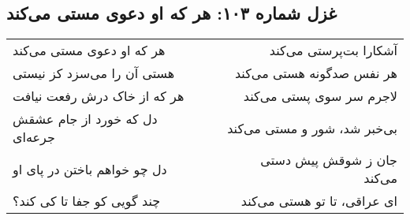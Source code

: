 \begin{center}
\section*{غزل شماره ۱۰۳: هر که او دعوی مستی می‌کند}
\label{sec:103}
\begin{longtable}{l p{0.5cm} r}
هر که او دعوی مستی می‌کند
&&
آشکارا بت‌پرستی می‌کند
\\
هستی آن را می‌سزد کز نیستی
&&
هر نفس صدگونه هستی می‌کند
\\
هر که از خاک درش رفعت نیافت
&&
لاجرم سر سوی پستی می‌کند
\\
دل که خورد از جام عشقش جرعه‌ای
&&
بی‌خبر شد، شور و مستی می‌کند
\\
دل چو خواهم باختن در پای او
&&
جان ز شوقش پیش دستی می‌کند
\\
چند گویی کو جفا تا کی کند؟
&&
ای عراقی، تا تو هستی می‌کند
\\
\end{longtable}
\end{center}
